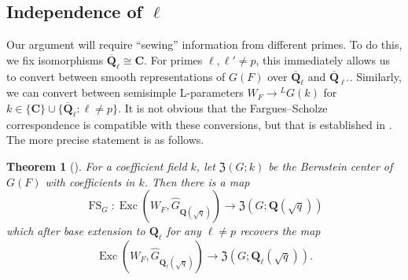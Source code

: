 \documentclass[reqno]{amsart}
\numberwithin{equation}{subsection}
\newcommand{\F}{\mathbf{F}}
\newcommand{\CC}{\mathbf{C}}
\newcommand{\Q}{\mathbf{Q}}
\newcommand{\Z}{\mathbf{Z}}
\newcommand{\mf}[1]{\mathfrak{#1}}
\newcommand{\ol}[1]{\overline{#1}}
\newcommand{\wh}[1]{\widehat{#1}}
\newcommand{\co}{\colon}
\newcommand{\ld}{{}^L}
\DeclareMathOperator{\Rep}{Rep}
\DeclareMathOperator{\Exc}{Exc}
\DeclareMathOperator{\sm}{sm}
\DeclareMathOperator{\FS}{FS}
\newcommand{\rH}{\ensuremath{\mathrm{H}}\xspace}
\renewcommand{\ss}{\mathrm{ss}}
\newtheorem{thm}{Theorem}[subsection]
\theoremstyle{remark}
\newtheorem{defn}[thm]{Definition}
\numberwithin{equation}{subsection}
\numberwithin{figure}{subsection}
\begin{document}






\subsection{Independence of $\ell$}\label{ssec:independence-of-ell}
 Our argument will require ``sewing'' information from different primes.  To do this, we fix isomorphisms $\ol \Q_\ell \cong \CC$. For primes $\ell, \ell' \neq p$, this immediately allows us to convert between smooth representations of $G(F)$ over $\ol\Q_\ell$ and $\ol\Q_{\ell'}$.
Similarly, we can convert between semisimple L-parameters $W_F \rightarrow \ld G(k)$ for $k \in \{\CC\} \cup \{\ol\Q_\ell : \ell \neq p\}$.
It is not obvious that the Fargues--Scholze correspondence is compatible with these conversions, but that is established in \cite{Sch25}. The more precise statement is as follows.

\begin{thm}[{\cite[Theorem 1.2]{Sch25}}]
For a coefficient field $k$, let $\mf{Z}(G;k)$ be the Bernstein center of $G(F)$ with coefficients in $k$. Then there is a map
\[
\FS_G \co \Exc(W_F, \wh G_{\Q(\sqrt{q})}) \rightarrow \mf{Z}(G; \Q(\sqrt{q}))
\]
which after base extension to $\Q_\ell$ for any $\ell \neq p$ recovers the map 
\[
\Exc(W_F, \wh G_{\Q_\ell(\sqrt{q})}) \rightarrow \mf{Z}(G; \Q_\ell(\sqrt{q})).
\]
\end{thm}
\end{document}
